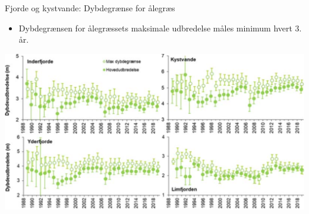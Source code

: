\begin{frame}{Fjorde og kystvande: Dybdegrænse for ålegræs}
  \begin{itemize}
    \item Dybdegrænsen for ålegræssets maksimale udbredelse måles minimum hvert 3. år.
  \end{itemize}
  \includegraphics[width=\textwidth]{figures/eelgrass}
\end{frame}
